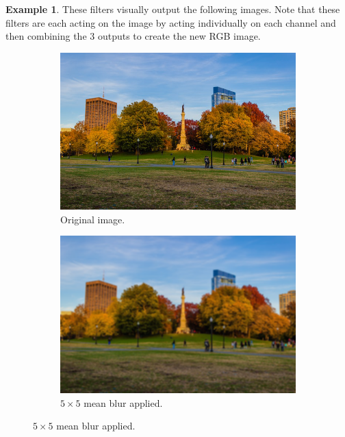 \documentclass{article}
\theoremstyle{definition}
\newtheorem{example}{Example}[section]
\theoremstyle{remark}
\theoremstyle{definition}
\begin{document}
\begin{example}
    These filters visually output the following images. Note that these filters are each acting on the image by acting individually on each channel and then combining the 3 outputs to create the new RGB image. 
    \begin{figure}[hbt!]
        \centering
        \begin{subfigure}[b]{0.32\textwidth}
        \centering
            \includegraphics[width=\textwidth]{img/OpenCV/Park_Full.png}
            \caption{Original image. }
            \label{fig:original_image}
        \end{subfigure}
        \begin{subfigure}[b]{0.32\textwidth}
        \centering
            \includegraphics[width=\textwidth]{img/OpenCV/Mean_Blur.png}
            \caption{$5 \times 5$ mean blur applied. }
            \label{fig:mean_blur_image}
        \end{subfigure}

\end{figure}
\end{example}
\end{document}
